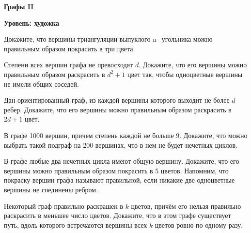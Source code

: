 \centerline{\bf \Huge Графы II}
\centerline{\bf \Huge Уровень: художка}

\begin{flushright}
        \scriptsize{}
\end{flushright}

Докажите, что вершины триангуляции выпуклого n$-$угольника можно правильным образом покрасить в три цвета.

Степени всех вершин графа не превосходят $d$. Докажите, что его вершины можно правильным образом раскрасить в $d^2+1$ цвет так, чтобы одноцветные вершины не имели общих соседей.

Дан ориентированный граф, из каждой вершины которого выходит не более $d$ ребер. Докажите, что его вершины можно правильным образом раскрасить в $2 d+1$ цвет.

В графе 1000 вершин, причем степень каждой не больше 9. Докажите, что можно выбрать такой подграф на 200 вершинах, что в нем не будет нечетных циклов.

В графе любые два нечетных цикла имеют общую вершину. Докажите, что его вершины можно правильным образом покрасить в 5 цветов. Напомним, что покраску вершин графа называют правильной, если никакие две одноцветные вершины не соединены ребром.

Некоторый граф правильно раскрашен в $k$ цветов, причём его нельзя правильно раскрасить в меньшее число цветов. Докажите, что в этом графе существует путь, вдоль которого встречаются вершины всех $k$ цветов ровно по одному разу.
